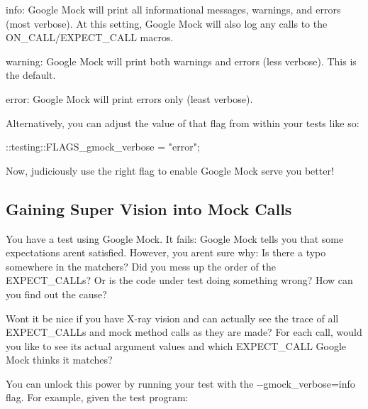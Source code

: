 \begin{DoxyItemize}
\item {\ttfamily info}\+: Google Mock will print all informational messages, warnings, and errors (most verbose). At this setting, Google Mock will also log any calls to the {\ttfamily O\+N\+\_\+\+C\+A\+L\+L/\+E\+X\+P\+E\+C\+T\+\_\+\+C\+A\+LL} macros.
\item {\ttfamily warning}\+: Google Mock will print both warnings and errors (less verbose). This is the default.
\item {\ttfamily error}\+: Google Mock will print errors only (least verbose).
\end{DoxyItemize}

Alternatively, you can adjust the value of that flag from within your tests like so\+:


\begin{DoxyCode}
::testing::FLAGS\_gmock\_verbose = \textcolor{stringliteral}{"error"};
\end{DoxyCode}


Now, judiciously use the right flag to enable Google Mock serve you better!

\subsection*{Gaining Super Vision into Mock Calls}

You have a test using Google Mock. It fails\+: Google Mock tells you that some expectations aren\textquotesingle{}t satisfied. However, you aren\textquotesingle{}t sure why\+: Is there a typo somewhere in the matchers? Did you mess up the order of the {\ttfamily E\+X\+P\+E\+C\+T\+\_\+\+C\+A\+LL}s? Or is the code under test doing something wrong? How can you find out the cause?

Won\textquotesingle{}t it be nice if you have X-\/ray vision and can actually see the trace of all {\ttfamily E\+X\+P\+E\+C\+T\+\_\+\+C\+A\+LL}s and mock method calls as they are made? For each call, would you like to see its actual argument values and which {\ttfamily E\+X\+P\+E\+C\+T\+\_\+\+C\+A\+LL} Google Mock thinks it matches?

You can unlock this power by running your test with the {\ttfamily -\/-\/gmock\+\_\+verbose=info} flag. For example, given the test program\+:


